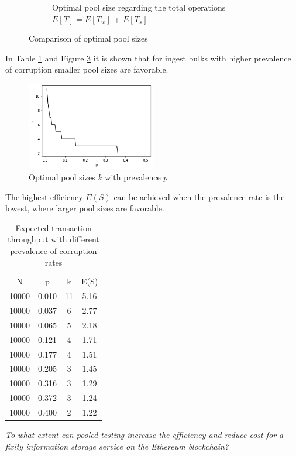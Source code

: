 \begin{figure}[b]
\begin{subfigure}{6cm}
        \caption{Optimal pool size regarding the total operations $E[T] = E[T_w]$ + $E[T_s]$.}\label{fig:expected_operations}
    \end{subfigure}
    \caption{Comparison of optimal pool sizes}%
    \label{fig:optimal_pool_size}%
\end{figure}
In Table \ref{tb:expected costs} and Figure \ref{fig:pool-sizes} it is shown that for ingest bulks with higher prevalence of corruption smaller pool sizes are favorable.
\begin{figure}[h]%
    \centering
    \caption{Optimal pool sizes $k$ with prevalence $p$}\label{fig:pool-sizes}
    \includegraphics[width=0.5\textwidth]{graphics/poolsizes.png}
\end{figure}
The highest efficiency $E(S)$ can be achieved when the prevalence rate is the lowest, where larger pool sizes are favorable.
\begin{table}[h]
    \caption{Expected transaction throughput with different prevalence of corruption rates}
    \centering
    \begin{tabular}{ c c c c}
    \label{tb:expected costs}
     N & p & k & E(S) \\ 
     10000 & 0.010 & 11 & 5.16 \\ 
     \hline
     10000 & 0.037 & 6 & 2.77 \\  
     \hline
     10000 & 0.065 & 5 & 2.18 \\  
     \hline
     10000 & 0.121 & 4 & 1.71 \\  
     \hline
     10000 & 0.177 & 4 & 1.51  \\
     \hline
     10000 & 0.205 & 3 & 1.45  \\
     \hline
     10000 & 0.316 & 3 & 1.29  \\
     \hline
     10000 & 0.372 & 3 & 1.24  \\
     \hline
     10000 & 0.400 & 2 & 1.22  
    \end{tabular}
\end{table}

\textit{To what extent can pooled testing increase the efficiency and reduce cost for a fixity information storage service on the Ethereum blockchain?}

